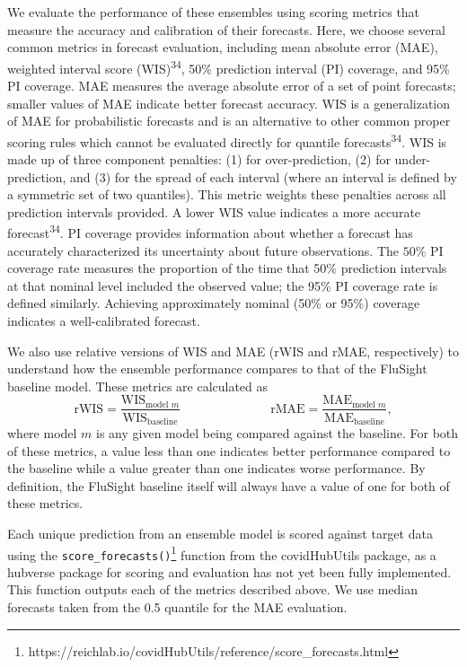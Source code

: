 \documentclass[
  letterpaper,
  DIV=11,
  numbers=noendperiod]{scrartcl}
\begin{document}
We evaluate the performance of these ensembles using scoring metrics
that measure the accuracy and calibration of their forecasts. Here, we
choose several common metrics in forecast evaluation, including mean
absolute error (MAE), weighted interval score (WIS)\textsuperscript{34},
50\% prediction interval (PI) coverage, and 95\% PI coverage. MAE
measures the average absolute error of a set of point forecasts; smaller
values of MAE indicate better forecast accuracy. WIS is a generalization
of MAE for probabilistic forecasts and is an alternative to other common
proper scoring rules which cannot be evaluated directly for quantile
forecasts\textsuperscript{34}. WIS is made up of three component
penalties: (1) for over-prediction, (2) for under-prediction, and (3)
for the spread of each interval (where an interval is defined by a
symmetric set of two quantiles). This metric weights these penalties
across all prediction intervals provided. A lower WIS value indicates a
more accurate forecast\textsuperscript{34}. PI coverage provides
information about whether a forecast has accurately characterized its
uncertainty about future observations. The \(50\)\% PI coverage rate
measures the proportion of the time that 50\% prediction intervals at
that nominal level included the observed value; the 95\% PI coverage
rate is defined similarly. Achieving approximately nominal (50\% or
95\%) coverage indicates a well-calibrated forecast.

We also use relative versions of WIS and MAE (rWIS and rMAE,
respectively) to understand how the ensemble performance compares to
that of the FluSight baseline model. These metrics are calculated as
\[\textrm{rWIS} = \frac{\textrm{WIS}_{\textrm{model }m}}{\textrm{WIS}_{\textrm{baseline}}} \hspace{3cm} \textrm{rMAE} = \frac{\textrm{MAE}_{\textrm{model }m}}{\textrm{MAE}_{\textrm{baseline}}},\]
where model \(m\) is any given model being compared against the
baseline. For both of these metrics, a value less than one indicates
better performance compared to the baseline while a value greater than
one indicates worse performance. By definition, the FluSight baseline
itself will always have a value of one for both of these metrics.

Each unique prediction from an ensemble model is scored against target
data using the \texttt{score\_forecasts()}\footnote{https://reichlab.io/covidHubUtils/reference/score\_forecasts.html}
function from the {covidHubUtils} package, as a hubverse package for
scoring and evaluation has not yet been fully implemented. This function
outputs each of the metrics described above. We use median forecasts
taken from the 0.5 quantile for the MAE evaluation.
\end{document}
